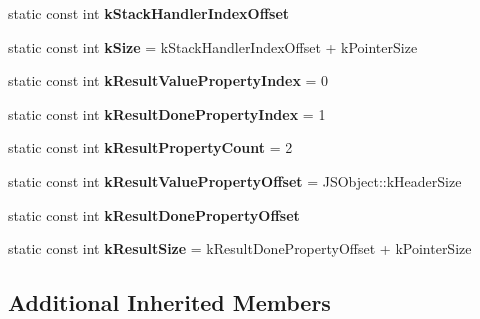 \begin{DoxyCompactItemize}
\item 
static const int {\bfseries k\+Stack\+Handler\+Index\+Offset}
\item 
\hypertarget{classv8_1_1internal_1_1_j_s_generator_object_afb29636ca53c2710518d76c1faefceef}{}static const int {\bfseries k\+Size} = k\+Stack\+Handler\+Index\+Offset + k\+Pointer\+Size\label{classv8_1_1internal_1_1_j_s_generator_object_afb29636ca53c2710518d76c1faefceef}

\item 
\hypertarget{classv8_1_1internal_1_1_j_s_generator_object_a367e6686cd074be3f9d0e1bd04998d29}{}static const int {\bfseries k\+Result\+Value\+Property\+Index} = 0\label{classv8_1_1internal_1_1_j_s_generator_object_a367e6686cd074be3f9d0e1bd04998d29}

\item 
\hypertarget{classv8_1_1internal_1_1_j_s_generator_object_a11dac2ecbd1a260ffd66cc6f9d3e8c95}{}static const int {\bfseries k\+Result\+Done\+Property\+Index} = 1\label{classv8_1_1internal_1_1_j_s_generator_object_a11dac2ecbd1a260ffd66cc6f9d3e8c95}

\item 
\hypertarget{classv8_1_1internal_1_1_j_s_generator_object_a8f89221ba322177d2440b23b05954644}{}static const int {\bfseries k\+Result\+Property\+Count} = 2\label{classv8_1_1internal_1_1_j_s_generator_object_a8f89221ba322177d2440b23b05954644}

\item 
\hypertarget{classv8_1_1internal_1_1_j_s_generator_object_a311060fac2186944ac08b2f2a9cbef14}{}static const int {\bfseries k\+Result\+Value\+Property\+Offset} = J\+S\+Object\+::k\+Header\+Size\label{classv8_1_1internal_1_1_j_s_generator_object_a311060fac2186944ac08b2f2a9cbef14}

\item 
static const int {\bfseries k\+Result\+Done\+Property\+Offset}
\item 
\hypertarget{classv8_1_1internal_1_1_j_s_generator_object_a0f5c7d30e78a55031e3392bfb3b54dbd}{}static const int {\bfseries k\+Result\+Size} = k\+Result\+Done\+Property\+Offset + k\+Pointer\+Size\label{classv8_1_1internal_1_1_j_s_generator_object_a0f5c7d30e78a55031e3392bfb3b54dbd}

\end{DoxyCompactItemize}
\subsection*{Additional Inherited Members}


